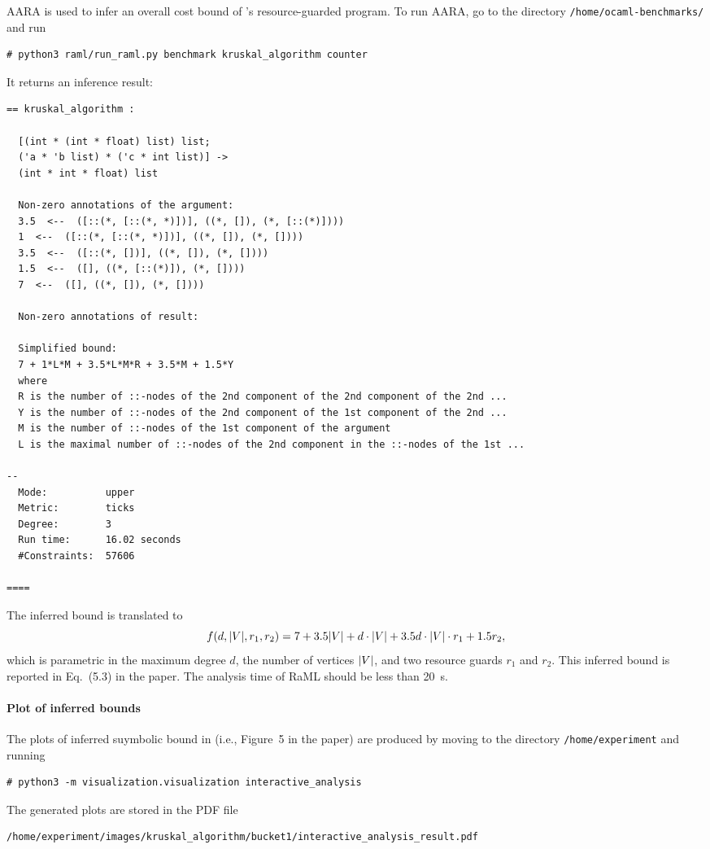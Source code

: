 AARA is used to infer an overall cost bound of \kruskal{}'s resource-guarded
program.
%
To run AARA, go to the directory \texttt{/home/ocaml-benchmarks/} and run
\begin{verbatim}
# python3 raml/run_raml.py benchmark kruskal_algorithm counter
\end{verbatim}
%
It returns an inference result:
\begin{Verbatim}[fontsize=\footnotesize]
== kruskal_algorithm :

  [(int * (int * float) list) list;
  ('a * 'b list) * ('c * int list)] ->
  (int * int * float) list

  Non-zero annotations of the argument:
  3.5  <--  ([::(*, [::(*, *)])], ((*, []), (*, [::(*)])))
  1  <--  ([::(*, [::(*, *)])], ((*, []), (*, [])))
  3.5  <--  ([::(*, [])], ((*, []), (*, [])))
  1.5  <--  ([], ((*, [::(*)]), (*, [])))
  7  <--  ([], ((*, []), (*, [])))

  Non-zero annotations of result:

  Simplified bound:
  7 + 1*L*M + 3.5*L*M*R + 3.5*M + 1.5*Y
  where
  R is the number of ::-nodes of the 2nd component of the 2nd component of the 2nd ...
  Y is the number of ::-nodes of the 2nd component of the 1st component of the 2nd ...
  M is the number of ::-nodes of the 1st component of the argument
  L is the maximal number of ::-nodes of the 2nd component in the ::-nodes of the 1st ...

--
  Mode:          upper
  Metric:        ticks
  Degree:        3
  Run time:      16.02 seconds
  #Constraints:  57606

====
\end{Verbatim}
%
The inferred bound is translated to
\begin{equation}
  f (d, |{V}|, r_1, r_2) = 7 + 3.5 |{V}| + d \cdot |{V}| + 3.5 d \cdot |{V}| \cdot r_1 + 1.5 r_2,
\end{equation}
which is parametric in the maximum degree $d$, the number of vertices $|{V}|$,
and two resource guards $r_1$ and $r_2$.
%
This inferred bound is reported in Eq.~(5.3) in the paper.
%
The analysis time of RaML should be less than \qty{20}{\second}.

\paragraph{Plot of inferred bounds}

The plots of inferred suymbolic bound in \kruskal{} (i.e., Figure~5 in the
paper) are produced by moving to the directory \texttt{/home/experiment} and
running
\begin{verbatim}
# python3 -m visualization.visualization interactive_analysis
\end{verbatim}
%
The generated plots are stored in the PDF file
\begin{verbatim}
/home/experiment/images/kruskal_algorithm/bucket1/interactive_analysis_result.pdf
\end{verbatim}

